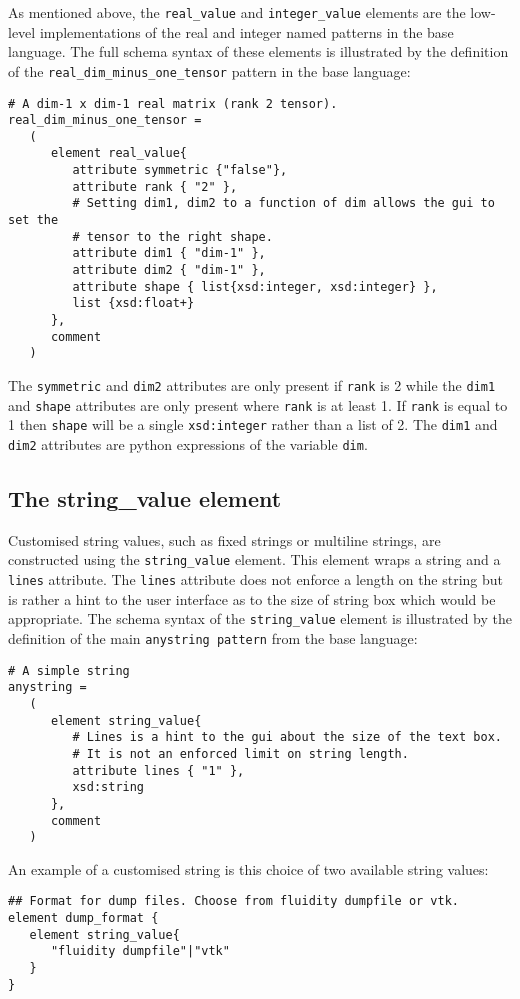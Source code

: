 \documentclass[a4paper, 11pt]{book}
\begin{document}
As mentioned above, the \verb+real_value+ and \verb+integer_value+
elements are the low-level implementations of the real and integer named
patterns in the base language. The full schema syntax of these elements is
illustrated by the definition of the \verb+real_dim_minus_one_tensor+
pattern in the base language:
\begin{lstlisting}
# A dim-1 x dim-1 real matrix (rank 2 tensor).
real_dim_minus_one_tensor =
   (
      element real_value{
         attribute symmetric {"false"},
         attribute rank { "2" },
         # Setting dim1, dim2 to a function of dim allows the gui to set the
         # tensor to the right shape.
         attribute dim1 { "dim-1" },
         attribute dim2 { "dim-1" },
         attribute shape { list{xsd:integer, xsd:integer} },
         list {xsd:float+}
      },
      comment
   )
\end{lstlisting}
The \lstinline+symmetric+ and \lstinline+dim2+ attributes are only present
if \lstinline+rank+ is 2 while the \lstinline+dim1+ and \lstinline+shape+
attributes are only present where \lstinline+rank+ is at least 1. If
\lstinline+rank+ is equal to 1 then \lstinline+shape+ will be a single
\lstinline+xsd:integer+ rather than a list of 2. The \lstinline+dim1+ and
\lstinline+dim2+ attributes are python expressions of the variable
\lstinline+dim+.


\subsection{The string\_value element}

Customised string values, such as fixed strings or multiline strings, are
constructed using the \lstinline+string_value+ element. This element wraps a
string and a \lstinline+lines+ attribute. The \lstinline+lines+ attribute
does not enforce a length on the string but is rather a hint to the user
interface as to the size of string box which would be appropriate. The
schema syntax of the \lstinline+string_value+ element is illustrated by the
definition of the main \lstinline+anystring pattern+ from the base language:
\begin{lstlisting}
# A simple string
anystring =
   (
      element string_value{
         # Lines is a hint to the gui about the size of the text box.
         # It is not an enforced limit on string length.
         attribute lines { "1" },
         xsd:string
      },
      comment
   )
\end{lstlisting}
An example of a customised string is this choice of two available string
values:
\begin{lstlisting}
## Format for dump files. Choose from fluidity dumpfile or vtk.
element dump_format {
   element string_value{
      "fluidity dumpfile"|"vtk"
   }
}  
\end{lstlisting}
\end{document}
